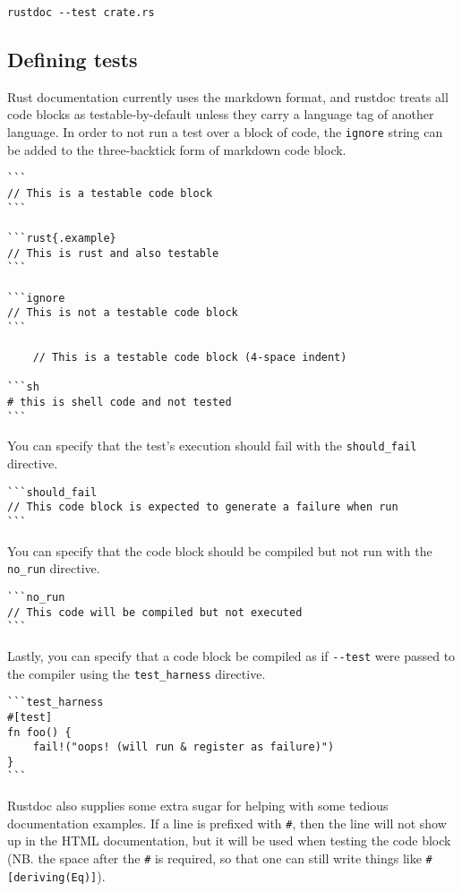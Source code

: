 \documentclass[]{article}
\begin{document}
\begin{verbatim}
rustdoc --test crate.rs
\end{verbatim}

\subsection{Defining tests}\label{defining-tests}

Rust documentation currently uses the markdown format, and rustdoc
treats all code blocks as testable-by-default unless they carry a
language tag of another language. In order to not run a test over a
block of code, the \texttt{ignore} string can be added to the
three-backtick form of markdown code block.

\begin{verbatim}
```
// This is a testable code block
```

```rust{.example}
// This is rust and also testable
```

```ignore
// This is not a testable code block
```

    // This is a testable code block (4-space indent)

```sh
# this is shell code and not tested
```
\end{verbatim}

You can specify that the test's execution should fail with the
\texttt{should\_fail} directive.

\begin{verbatim}
```should_fail
// This code block is expected to generate a failure when run
```
\end{verbatim}

You can specify that the code block should be compiled but not run with
the \texttt{no\_run} directive.

\begin{verbatim}
```no_run
// This code will be compiled but not executed
```
\end{verbatim}

Lastly, you can specify that a code block be compiled as if
\texttt{-\/-test} were passed to the compiler using the
\texttt{test\_harness} directive.

\begin{verbatim}
```test_harness
#[test]
fn foo() {
    fail!("oops! (will run & register as failure)")
}
```
\end{verbatim}

Rustdoc also supplies some extra sugar for helping with some tedious
documentation examples. If a line is prefixed with \texttt{\#}, then the
line will not show up in the HTML documentation, but it will be used
when testing the code block (NB. the space after the \texttt{\#} is
required, so that one can still write things like
\texttt{\#{[}deriving(Eq){]}}).
\end{document}
